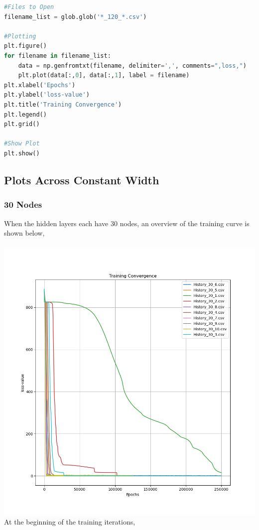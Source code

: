 \documentclass[a4paper, 12pt]{report}
\def\size{0.75}
\begin{document}
\begin{center}
\begin{lstlisting}[language=python]
#Files to Open
filename_list = glob.glob('*_120_*.csv')

#Plotting
plt.figure()
for filename in filename_list:
    data = np.genfromtxt(filename, delimiter=',', comments=",loss,")
    plt.plot(data[:,0], data[:,1], label = filename)
plt.xlabel('Epochs')
plt.ylabel('loss-value')
plt.title('Training Convergence')
plt.legend()
plt.grid()

#Show Plot
plt.show()
\end{lstlisting}
\newpage
\subsection{Plots Across Constant Width}
\subsubsection{30 Nodes}
When the hidden layers each have $30$ nodes, an overview of the training curve is shown below,
\\~\\\includegraphics[scale=\size]{Width_30_Overview.png}
\newpage
At the beginning of the training iterations,

\end{center}
\end{document}
